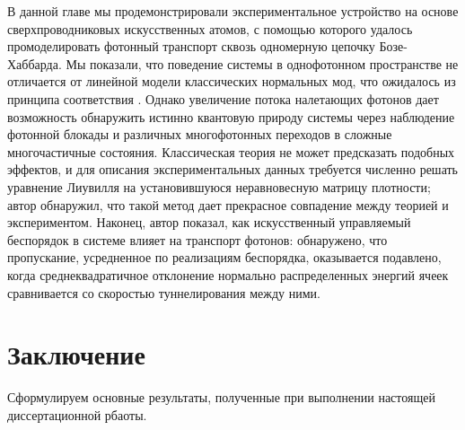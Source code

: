 \documentclass[14pt, a4paper]{extreport}
\numberwithin{equation}{section}
\begin{document}
В данной главе мы продемонстрировали экспериментальное устройство на основе сверхпроводниковых искусственных атомов, с помощью которого удалось промоделировать фотонный транспорт сквозь одномерную цепочку Бозе-Хаббарда. Мы показали, что поведение системы в однофотонном пространстве не отличается от линейной модели классических нормальных мод, что ожидалось из принципа соответствия \cite{park2012classical}. Однако увеличение потока налетающих фотонов дает возможность обнаружить истинно квантовую природу системы через наблюдение фотонной блокады и различных многофотонных переходов в сложные многочастичные состояния. Классическая теория не может предсказать подобных эффектов, и для описания экспериментальных данных требуется численно решать уравнение Лиувилля на установившуюся неравновесную матрицу плотности; автор обнаружил, что такой метод дает прекрасное совпадение между теорией и экспериментом. Наконец, автор показал, как искусственный управляемый беспорядок в системе влияет на транспорт фотонов: обнаружено, что пропускание, усредненное по реализациям беспорядка, оказывается подавлено, когда среднеквадратичное отклонение нормально распределенных энергий ячеек сравнивается со скоростью туннелирования между ними.

\chapter{Заключение}

Сформулируем основные результаты, полученные при выполнении настоящей диссертационной рбаоты.
\end{document}
